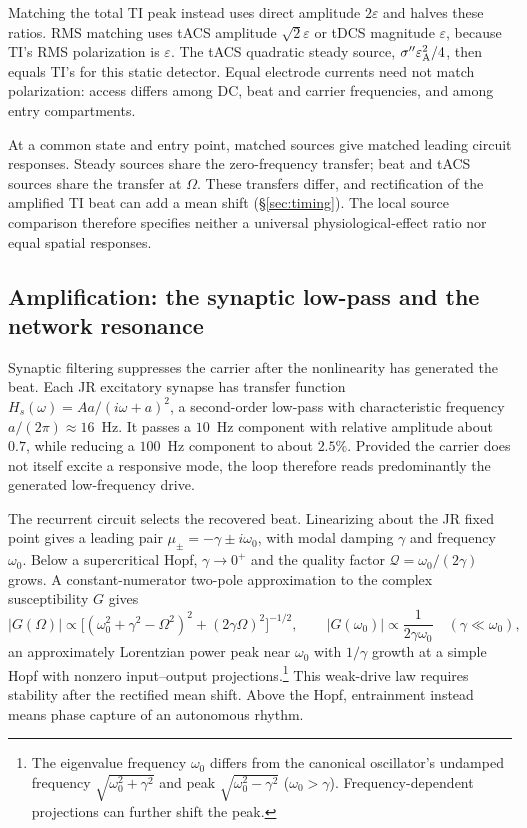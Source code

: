 \documentclass[11pt,a4paper]{article}
\newcommand{\Sig}{\sigma}
\providecommand{\DIFdeltex}[1]{{\protect\color{red} \scriptsize #1}} %
\providecommand{\DIFdelbegin}{} %
\providecommand{\DIFdelend}{} %
\providecommand{\DIFdel}[1]{\texorpdfstring{\DIFdeltex{#1}}{}} %
\begin{document}
Matching the total TI peak instead uses direct amplitude $2\varepsilon$
and halves these ratios. RMS matching uses tACS amplitude
$\sqrt2\varepsilon$ or tDCS magnitude $\varepsilon$, because TI's RMS
polarization is $\varepsilon$. The tACS quadratic steady source,
$\Sig''\varepsilon_{\rm A}^2/4$, then equals TI's for this static detector.
Equal electrode currents need not match polarization: access differs among
DC, beat and carrier frequencies, and among entry compartments.

At a common state and entry point, matched sources give matched leading
circuit responses. Steady sources share the zero-frequency transfer; beat
and tACS sources share the transfer at $\Omega$. These transfers differ,
and rectification of the amplified TI beat can add a mean shift\DIFdelbegin \DIFdel{(\S\ref{sec:timing})}\DIFdelend .
The local source comparison therefore specifies
neither a universal physiological-effect ratio nor equal spatial responses.

\subsection{Amplification: the synaptic low-pass and the network resonance}\label{sec:carrier}
Synaptic filtering suppresses the carrier after the nonlinearity has generated
the beat. Each JR excitatory synapse has transfer function
$H_s(\omega)=Aa/(i\omega+a)^2$, a second-order low-pass with characteristic
frequency $a/(2\pi)\approx16$~Hz. It passes a $10$~Hz component with relative
amplitude about $0.7$, while reducing a $100$~Hz component to about $2.5\%$. Provided the carrier does not itself excite a responsive
mode, the loop therefore reads predominantly the generated low-frequency drive.


The recurrent circuit selects the recovered beat. Linearizing about the JR
fixed point gives a leading pair $\mu_\pm=-\gamma\pm i\omega_0$, with
modal damping $\gamma$ and frequency $\omega_0$. Below a supercritical
Hopf, $\gamma\to0^+$ and the quality factor
$\mathcal Q=\omega_0/(2\gamma)$ grows. A constant-numerator two-pole
approximation to the complex susceptibility $G$ gives
\begin{equation}
|G(\Omega)|\propto\big[(\omega_0^2+\gamma^2-\Omega^2)^2+(2\gamma\Omega)^2\big]^{-1/2},
\qquad |G(\omega_0)|\propto\frac{1}{2\gamma\omega_0}
\quad(\gamma\ll\omega_0),
\label{eq:gain}
\end{equation}
an approximately Lorentzian power peak near $\omega_0$ with $1/\gamma$
growth at a simple Hopf with nonzero input--output projections.\footnote{
The eigenvalue frequency $\omega_0$ differs from the canonical oscillator's
undamped frequency $\sqrt{\omega_0^2+\gamma^2}$ and peak
$\sqrt{\omega_0^2-\gamma^2}$ ($\omega_0>\gamma$).
Frequency-dependent projections can further shift the peak.}
This weak-drive law requires stability after the rectified mean shift.
Above the Hopf, entrainment instead means phase capture of an autonomous rhythm.
\end{document}

